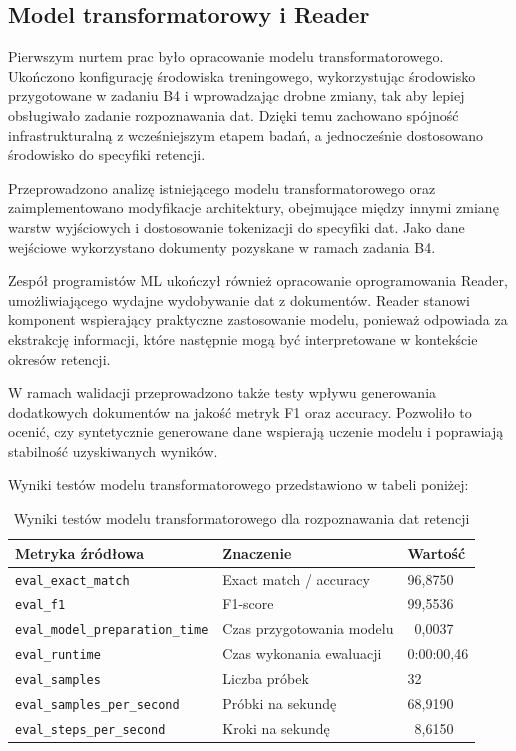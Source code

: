 \documentclass[12pt,a4paper]{report}
\begin{document}
\subsection{Model transformatorowy i Reader}
Pierwszym nurtem prac było opracowanie modelu transformatorowego. Ukończono konfigurację środowiska treningowego, wykorzystując środowisko przygotowane w zadaniu B4 i wprowadzając drobne zmiany, tak aby lepiej obsługiwało zadanie rozpoznawania dat. Dzięki temu zachowano spójność infrastrukturalną z wcześniejszym etapem badań, a jednocześnie dostosowano środowisko do specyfiki retencji.

Przeprowadzono analizę istniejącego modelu transformatorowego oraz zaimplementowano modyfikacje architektury, obejmujące między innymi zmianę warstw wyjściowych i dostosowanie tokenizacji do specyfiki dat. Jako dane wejściowe wykorzystano dokumenty pozyskane w ramach zadania B4.

Zespół programistów ML ukończył również opracowanie oprogramowania Reader, umożliwiającego wydajne wydobywanie dat z dokumentów. Reader stanowi komponent wspierający praktyczne zastosowanie modelu, ponieważ odpowiada za ekstrakcję informacji, które następnie mogą być interpretowane w kontekście okresów retencji.

W ramach walidacji przeprowadzono także testy wpływu generowania dodatkowych dokumentów na jakość metryk F1 oraz accuracy. Pozwoliło to ocenić, czy syntetycznie generowane dane wspierają uczenie modelu i poprawiają stabilność uzyskiwanych wyników.

Wyniki testów modelu transformatorowego przedstawiono w tabeli poniżej:

\begin{table}[h]
    \centering
    \caption{Wyniki testów modelu transformatorowego dla rozpoznawania dat retencji}
    \begin{tabular}{l l l}
        \toprule
        Metryka źródłowa & Znaczenie & Wartość \\
        \midrule
        \texttt{eval\_exact\_match} & Exact match / accuracy & 96{,}8750 \\
        \texttt{eval\_f1} & F1-score & 99{,}5536 \\
        \texttt{eval\_model\_preparation\_time} & Czas przygotowania modelu & ~0{,}0037 \\
        \texttt{eval\_runtime} & Czas wykonania ewaluacji & 0:00:00{,}46 \\
        \texttt{eval\_samples} & Liczba próbek & 32 \\
        \texttt{eval\_samples\_per\_second} & Próbki na sekundę & 68{,}9190 \\
        \texttt{eval\_steps\_per\_second} & Kroki na sekundę & ~8{,}6150 \\
        \bottomrule
    \end{tabular}
\end{table}
\end{document}
